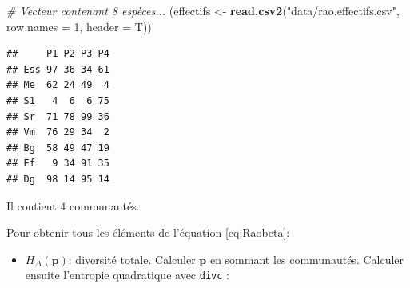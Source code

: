 \documentclass[
  11pt,
  french,
  a4paper,
  extrafontsizes,onecolumn,openright
  ]{memoir}
\newenvironment{Shaded}{\begin{snugshade}}{\end{snugshade}}
\newcommand{\CommentTok}[1]{\textcolor[rgb]{0.56,0.35,0.01}{\textit{#1}}}
\newcommand{\DataTypeTok}[1]{\textcolor[rgb]{0.13,0.29,0.53}{#1}}
\newcommand{\DecValTok}[1]{\textcolor[rgb]{0.00,0.00,0.81}{#1}}
\newcommand{\KeywordTok}[1]{\textcolor[rgb]{0.13,0.29,0.53}{\textbf{#1}}}
\newcommand{\NormalTok}[1]{#1}
\newcommand{\OperatorTok}[1]{\textcolor[rgb]{0.81,0.36,0.00}{\textbf{#1}}}
\newcommand{\OtherTok}[1]{\textcolor[rgb]{0.56,0.35,0.01}{#1}}
\newcommand{\StringTok}[1]{\textcolor[rgb]{0.31,0.60,0.02}{#1}}
\providecommand{\tightlist}{%
  \setlength{\itemsep}{0pt}\setlength{\parskip}{0pt}}
\begin{document}
\scriptsize

\begin{Shaded}
\begin{Highlighting}[]
\CommentTok{# Vecteur contenant 8 espèces...}
\NormalTok{(effectifs <-}\StringTok{ }\KeywordTok{read.csv2}\NormalTok{(}\StringTok{"data/rao.effectifs.csv"}\NormalTok{, }\DataTypeTok{row.names =} \DecValTok{1}\NormalTok{, }
    \DataTypeTok{header =}\NormalTok{ T))}
\end{Highlighting}
\end{Shaded}

\begin{verbatim}
##     P1 P2 P3 P4
## Ess 97 36 34 61
## Me  62 24 49  4
## S1   4  6  6 75
## Sr  71 78 99 36
## Vm  76 29 34  2
## Bg  58 49 47 19
## Ef   9 34 91 35
## Dg  98 14 95 14
\end{verbatim}

\begin{Shaded}
\end{Shaded}

\normalsize

Il contient 4 communautés.

Pour obtenir tous les éléments de l'équation \eqref{eq:Raobeta}:

\begin{itemize}
\tightlist
\item
  \(H_{\Delta }\left(\mathbf{p}\right)\): diversité totale. Calculer \(\mathbf{p}\) en sommant les communautés. Calculer ensuite l'entropie quadratique avec \texttt{divc} :
\end{itemize}
\end{document}
